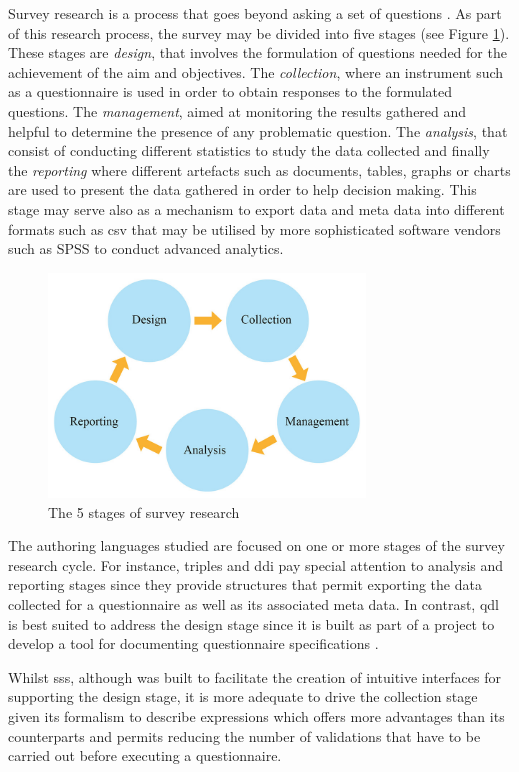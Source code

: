 	Survey research is a process that goes beyond asking a set of questions \cite{booklet:ibm12}. As part of this research process, the survey may be divided into five stages (see Figure \ref{fig:literature:5stages}). These stages are \emph{design}, that involves the formulation of questions needed for the achievement of the aim and objectives. The \emph{collection}, where an instrument such as a questionnaire is used in order to obtain responses to the formulated questions. The \emph{management}, aimed at monitoring the results gathered and helpful to determine the presence of any problematic question. The \emph{analysis}, that consist of conducting different statistics to study the data collected and finally the \emph{reporting} where different artefacts such as documents, tables, graphs or charts are used to present the data gathered in order to help decision making. This stage may serve also as a mechanism to export data and meta data into different formats such as \gls{csv} that may be utilised by more sophisticated software vendors such as SPSS to conduct advanced analytics.

	\begin{figure}[h]
	\centering
	\includegraphics[width=0.75\textwidth]{literature/img/5stage.jpg}
	\caption{The 5 stages of survey research}
	\label{fig:literature:5stages}
	\end{figure}

	The authoring languages studied are focused on one or more stages of the survey research cycle. For instance, \gls{triples} and \gls{ddi} pay special attention to analysis and reporting stages since they provide structures that permit exporting the data collected for a questionnaire as well as its associated meta data. 
	In contrast, \gls{qdl} is best suited to address the design stage since it is built as part of a project to develop a tool for documenting questionnaire specifications \cite{man:bethlehem02}. 

	Whilst \gls{sss}, although was built to facilitate the creation of intuitive interfaces for supporting the design stage, it is more adequate to drive the collection stage given its formalism to describe expressions which offers more advantages than its counterparts and permits reducing the number of validations that have to be carried out before executing a questionnaire.